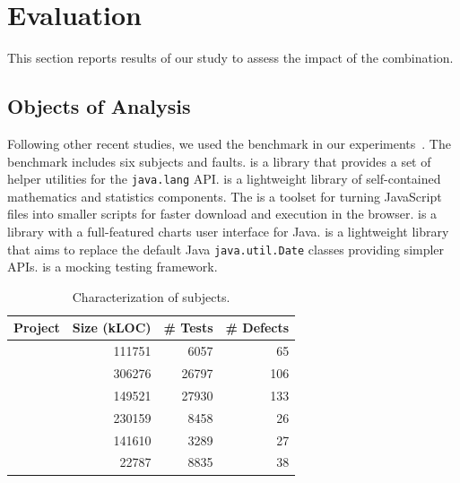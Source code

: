 \documentclass{article}
\begin{document}
\section{Evaluation}
\label{sec:eval}


This section reports results of our study to assess the impact of the
\comb{} combination.

\subsection{Objects of Analysis}

Following other recent studies, we used the \dfj{} benchmark in our
experiments~\cite{just-defects4j-issta2014}. The \dfj{} benchmark
includes six subjects and \numFaults{} faults.
\lang{} is a library
that provides a set of helper utilities for the {\small\texttt{java.lang}}
API. \cmath{} is a lightweight library of self-contained
mathematics and statistics components. The \closure{} is a toolset for
turning JavaScript files into smaller scripts for faster
download and execution in the browser. \chart{} is a library with a
full-featured charts user interface for Java. \jtime{} is a
lightweight library that aims to replace the default Java
{\small\texttt{java.util.Date}} classes providing simpler APIs. \mockito{} is
a mocking testing framework.

\newcommand{\cgray}[1]{\cellcolor{gray!25}#1}
\begin{table}[h]
  \centering
  \setlength{\tabcolsep}{4pt}
    \begin{tabular}{lrrr}
      \toprule
      Project            & Size (kLOC) & \# Tests & \# Defects \\ %
      \midrule
      \lang{}            & 111751  & 6057 & 65       \\   %
      \cmath{}           & 306276  & 26797 & 106     \\   %
      \closure{}         & 149521  & 27930  & 133     \\   %
      \chart{}           & 230159  & 8458 & 26      \\  %
      \jtime{}           & 141610  & 3289 & 27       \\   %
      \mockito{}         & 22787  & 8835 & 38    \\     %
      \bottomrule
  \end{tabular}
\caption {Characterization of \dfj{} subjects.}
\end{table}
\normalsize
\end{document}
